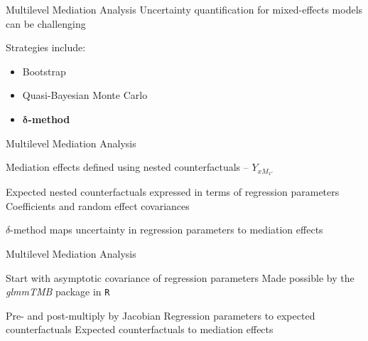 \documentclass[14pt]{beamer}
\begin{document}
\begin{frame}{Multilevel Mediation Analysis}
    Uncertainty quantification for mixed-effects models can be challenging  \newline
    
    Strategies include:
    \begin{itemize}
        \item Bootstrap
        \item Quasi-Bayesian Monte Carlo
        \item $\bm{\delta}$\textbf{-method}
    \end{itemize}
\end{frame}

\begin{frame}{Multilevel Mediation Analysis}
    \begin{outline}
        
        \1 Mediation effects defined using nested counterfactuals -- $ Y_{xM_{x'}}$

        \1 Expected nested counterfactuals expressed in terms of regression parameters
            \2 Coefficients and random effect covariances \newline

        \1 $\delta$-method maps uncertainty in regression parameters to mediation effects

    \end{outline}

\end{frame}

\begin{frame}{Multilevel Mediation Analysis}
    \begin{outline}
        \1 Start with asymptotic covariance of regression parameters
            \2 Made possible by the \textit{glmmTMB} package in \texttt{R} \newline

        \1 Pre- and post-multiply by Jacobian
            \2 Regression parameters to expected counterfactuals
            \2 Expected counterfactuals to mediation effects
        

    \end{outline}
    


\end{frame}
\end{document}
